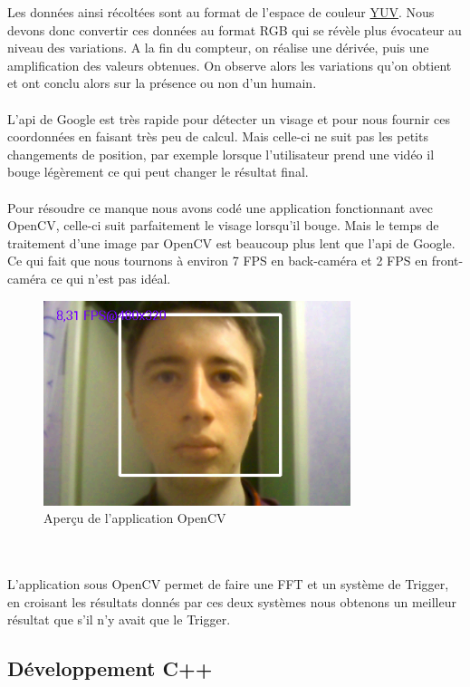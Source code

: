 Les données ainsi récoltées sont au format de l'espace de couleur \href{http://fr.wikipedia.org/wiki/YUV}{YUV}. Nous devons donc convertir ces données au format RGB qui se révèle plus évocateur au niveau des variations. 
	A la fin du compteur, on réalise une dérivée, puis une amplification des valeurs obtenues. On observe alors les variations qu'on obtient et ont conclu alors sur la présence ou non d'un humain.
	\\
	\\
	L'api de Google est très rapide pour détecter un visage et pour nous fournir ces coordonnées en faisant très peu de calcul. Mais celle-ci ne suit pas les petits changements de position, par exemple lorsque l'utilisateur prend une vidéo il bouge légèrement ce qui peut changer le résultat final.
	\\
	\\
	Pour résoudre ce manque nous avons codé une application fonctionnant avec OpenCV, celle-ci suit parfaitement le visage lorsqu'il bouge. Mais le temps de traitement d'une image par OpenCV est beaucoup plus lent que l'api de Google. Ce qui fait que nous tournons à environ 7 FPS en back-caméra et 2 FPS en front-caméra ce qui n'est pas idéal.
	\begin{figure}[h!]
			\centering
			\includegraphics[width=0.8\textwidth]{data/opencv.png}
			\caption{Aperçu de l'application OpenCV}
		\end{figure}
	\\
	\\
	L'application sous OpenCV permet de faire une FFT et un système de Trigger, en croisant les résultats donnés par ces deux systèmes nous obtenons un meilleur résultat que s'il n'y avait que le Trigger.  

\subsection{Développement C++}

